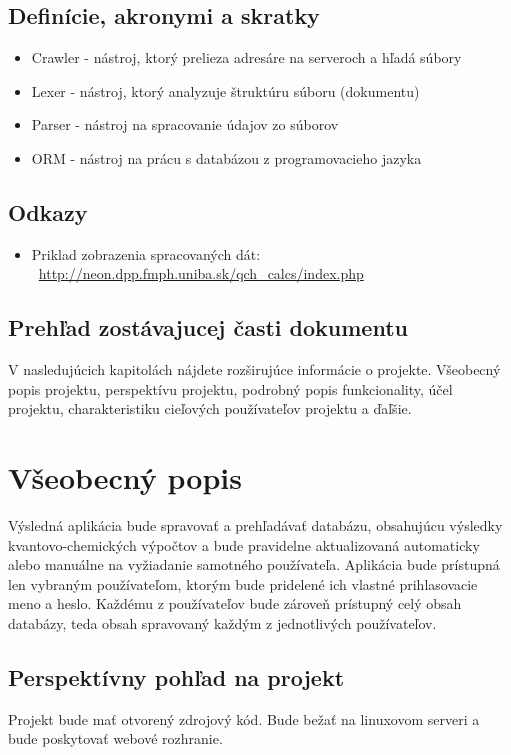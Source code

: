 \documentclass[12pt,a4paper]{article}
\begin{document}
\subsection{Definície, akronymi a skratky}
\begin{itemize}
	\item Crawler - nástroj, ktorý prelieza adresáre na serveroch a hľadá súbory
	\item Lexer - nástroj, ktorý analyzuje štruktúru súboru (dokumentu)
	\item Parser - nástroj na spracovanie údajov zo súborov
	\item ORM - nástroj na prácu s databázou z programovacieho jazyka
\end{itemize}

\subsection{Odkazy}
\begin{itemize}
	\item Priklad zobrazenia spracovaných dát: \ \url{http://neon.dpp.fmph.uniba.sk/qch_calcs/index.php}
\end{itemize}

\subsection{Prehľad zostávajucej časti dokumentu}
V nasledujúcich kapitolách nájdete rozširujúce informácie o projekte.
Všeobecný popis projektu, perspektívu projektu, podrobný popis funkcionality, účel projektu, charakteristiku cieľových používateľov projektu a ďaľšie.


\section{Všeobecný popis}
Výsledná aplikácia bude spravovať a prehľadávať databázu, obsahujúcu výsledky kvantovo-chemických výpočtov a bude pravidelne aktualizovaná automaticky alebo manuálne na vyžiadanie samotného používateľa. Aplikácia bude prístupná len vybraným používateľom, ktorým bude pridelené ich vlastné prihlasovacie meno a heslo. Každému z používateľov bude zároveň prístupný celý obsah databázy, teda obsah spravovaný každým z jednotlivých používateľov.

\subsection{Perspektívny pohľad na projekt}
Projekt bude mať otvorený zdrojový kód. Bude bežať na linuxovom serveri a bude poskytovať webové rozhranie.
\end{document}
